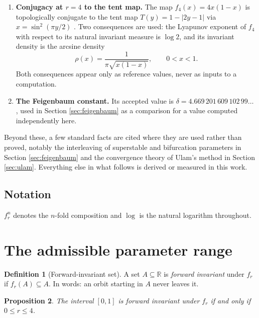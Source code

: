 \documentclass[11pt,a4paper]{article}
\newtheorem{proposition}{Proposition}[section]
\theoremstyle{definition}
\newtheorem{definition}[proposition]{Definition}
\theoremstyle{remark}
\newcommand{\logmap}{f_r}
\newcommand{\R}{\mathbb{R}}
\begin{document}
\begin{enumerate}
  \item[(C1)] \textbf{Conjugacy at $r=4$ to the tent map.} The map
    $f_4(x)=4x(1-x)$ is topologically conjugate to the tent map
    $T(y)=1-|2y-1|$ via $x = \sin^2(\pi y/2)$ \cite{Devaney2003,Ott2002}. Two
    consequences are used: the Lyapunov exponent of $f_4$ with respect to its
    natural invariant measure is $\log 2$, and its invariant density is the
    arcsine density
    \begin{equation}
      \rho(x) = \frac{1}{\pi\sqrt{x(1-x)}}, \qquad 0<x<1 .
      \label{eq:arcsine}
    \end{equation}
    Both consequences appear only as reference values,
    never as inputs to a computation.
  \item[(C2)] \textbf{The Feigenbaum constant.} Its accepted value is
    $\delta = 4.669\,201\,609\,102\,99\ldots$ \cite{Feigenbaum1978}, used in
    Section \ref{sec:feigenbaum} as a comparison for a value computed
    independently here.
\end{enumerate}

Beyond these, a few standard facts are cited where they are used rather than
proved, notably the interleaving of superstable and bifurcation parameters in
Section \ref{sec:feigenbaum} and the convergence theory of Ulam's method in
Section \ref{sec:ulam}. Everything else in what follows is derived or measured
in this work.

\subsection{Notation}

$\logmap^{n}$ denotes the $n$-fold composition and $\log$ is the natural logarithm throughout.

\section{The admissible parameter range}
\label{sec:invariance}

\begin{definition}[Forward-invariant set]
A set $A\subseteq\R$ is \emph{forward invariant} under $\logmap$ if
$\logmap(A)\subseteq A$. In words: an orbit starting in $A$ never leaves it.
\end{definition}

\begin{proposition}
\label{prop:invariance}
The interval $[0,1]$ is forward invariant under $\logmap$ if and only if
$0 \le r \le 4$.
\end{proposition}
\end{document}

